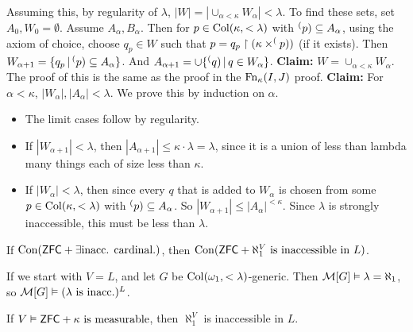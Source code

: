 \documentclass{article}
\begin{document}
    Assuming this, by regularity of $\lambda$, $|W| = |\cup_{\alpha<\kappa} W_{\alpha}| < \lambda$. \gap
    To find these sets, set $A_{0},W_{0}=\emptyset$. Assume $A_{\alpha}, B_{\alpha}$. Then for $p \in \operatorname{Col}(\kappa, <\lambda)$ with $\sp(p) \subseteq A_{\alpha}$, using the axiom of choice, choose $q_{p} \in W$ such that $p = q_{p} \upharpoonright (\kappa \times \sp(p))$ (if it exists).\gap
    Then $W_{\alpha+1} = \{ q_{p} \, | \, \sp(p) \subseteq A_{\alpha}\}$. And $A_{\alpha+1}= \cup\{\sp(q) \, | \, q \in W_{\alpha}\}$. \gap
    \textbf{Claim:} $W = \cup_{\alpha < \kappa} W_{\alpha}$.\gap
    The proof of this is the same as the proof in the $\operatorname{Fn}_{\kappa}(I,J)$ proof. \gap
    \textbf{Claim:} For $\alpha < \kappa$, $|W_{\alpha}|,|A_{\alpha}|<\lambda$.\gap
    We prove this by induction on $\alpha$.\begin{itemize}
        \item The limit cases follow by regularity.
        \item If $|W_{\alpha+1}| < \lambda$, then $|A_{\alpha+1}| \leq \kappa \cdot \lambda = \lambda$, since it is a union of less than lambda many things each of size less than $\kappa$.
        \item If $|W_{\alpha}| < \lambda$, then since every $q$ that is added to $W_{\alpha}$ is chosen from some $p \in \operatorname{Col}(\kappa, <\lambda)$ with $\sp(p) \subseteq A_{\alpha}$. So $|W_{\alpha+1}| \leq |A_{\alpha}|^{<\kappa}$. Since $\lambda$ is strongly inaccessible, this must be less than $\lambda$.
    \end{itemize}
    \endproof
    \begin{corr}{}
        If $\operatorname{Con}(\mathsf{ZFC} + \exists \text{inacc. cardinal.})$, then $\operatorname{Con}(\mathsf{ZFC} + \aleph_{1}^{V} \text{ is inaccessible in $L$})$.
    \end{corr}
    \proof If we start with $V=L$, and let $G$ be $\operatorname{Col}(\omega_{1},<\lambda)$-generic. Then $\mathcal{M}[G] \vDash \lambda = \aleph_{1}$, so $\mathcal{M}[G] \vDash (\lambda \text{ is inacc.})^{L}$. \endproof
    \begin{remark*}
        If $V \vDash \mathsf{ZFC} + \kappa \text{ is measurable}$, then $\aleph_{1}^{V}$ is inaccessible in $L$.
    \end{remark*}
\end{document}
